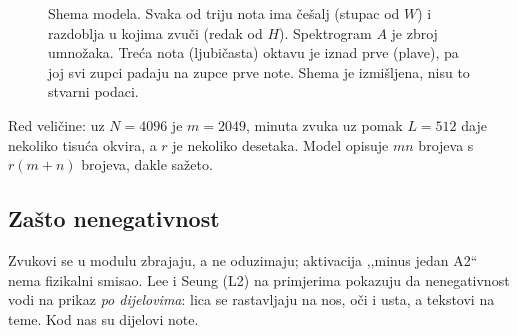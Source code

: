 \documentclass[11pt,a4paper]{article}
\theoremstyle{definition}
\theoremstyle{plain}
\theoremstyle{remark}
\begin{document}
\begin{figure}[ht]
\centering
{}
\caption{Shema modela. Svaka od triju nota ima češalj (stupac od $W$) i razdoblja u kojima zvuči
(redak od $H$). Spektrogram $A$ je zbroj umnožaka. Treća nota (ljubičasta) oktavu je iznad prve
(plave), pa joj svi zupci padaju na zupce prve note. Shema je izmišljena, nisu to stvarni podaci.}
\label{fig:model}
\end{figure}

Red veličine: uz $N=4096$ je $m=2049$, minuta zvuka uz pomak $L=512$ daje nekoliko tisuća okvira,
a $r$ je nekoliko desetaka. Model opisuje $mn$ brojeva s $r(m+n)$ brojeva, dakle sažeto.

\subsection{Zašto nenegativnost}

Zvukovi se u modulu zbrajaju, a ne oduzimaju; aktivacija ,,minus jedan A2`` nema fizikalni smisao.
Lee i Seung (L2) na primjerima pokazuju da nenegativnost vodi na prikaz \emph{po dijelovima}:
lica se rastavljaju na nos, oči i usta, a tekstovi na teme. Kod nas su dijelovi note.
\end{document}
